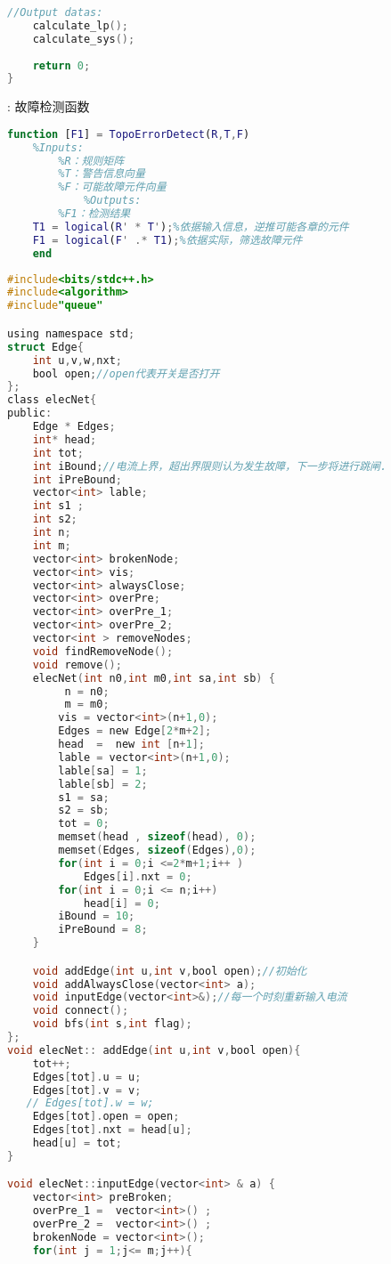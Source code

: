 \documentclass[withoutpreface,bwprint]{cumcmthesis} %
\begin{document}
\begin{appendices}
\begin{lstlisting}[language=C]
//Output datas:
    calculate_lp();
    calculate_sys();
    
    return 0;
}
\end{lstlisting}

: 故障检测函数
\begin{lstlisting}[language=matlab]
    function [F1] = TopoErrorDetect(R,T,F)
    %Inputs:
        %R：规则矩阵
        %T：警告信息向量
        %F：可能故障元件向量
            %Outputs:
        %F1：检测结果
    T1 = logical(R' * T');%依据输入信息，逆推可能各章的元件
    F1 = logical(F' .* T1);%依据实际，筛选故障元件
    end
\end{lstlisting}  

\begin{lstlisting}[language=C]
    #include<bits/stdc++.h>
#include<algorithm>
#include"queue"

using namespace std;
struct Edge{
    int u,v,w,nxt;
    bool open;//open代表开关是否打开
};
class elecNet{
public:
    Edge * Edges;
    int* head;
    int tot;
    int iBound;//电流上界，超出界限则认为发生故障，下一步将进行跳闸.
    int iPreBound;
    vector<int> lable;
    int s1 ;
    int s2;
    int n;
    int m;
    vector<int> brokenNode;
    vector<int> vis;
    vector<int> alwaysClose;
    vector<int> overPre;
    vector<int> overPre_1;
    vector<int> overPre_2;
    vector<int > removeNodes;
    void findRemoveNode();
    void remove();
    elecNet(int n0,int m0,int sa,int sb) {
         n = n0;
         m = m0;
        vis = vector<int>(n+1,0);
        Edges = new Edge[2*m+2];
        head  =  new int [n+1];
        lable = vector<int>(n+1,0);
        lable[sa] = 1;
        lable[sb] = 2;
        s1 = sa;
        s2 = sb;
        tot = 0;
        memset(head , sizeof(head), 0);
        memset(Edges, sizeof(Edges),0);
        for(int i = 0;i <=2*m+1;i++ )
            Edges[i].nxt = 0;
        for(int i = 0;i <= n;i++)
            head[i] = 0;
        iBound = 10;
        iPreBound = 8;
    }

    void addEdge(int u,int v,bool open);//初始化
    void addAlwaysClose(vector<int> a);
    void inputEdge(vector<int>&);//每一个时刻重新输入电流
    void connect();
    void bfs(int s,int flag);
};
void elecNet:: addEdge(int u,int v,bool open){
    tot++;
    Edges[tot].u = u;
    Edges[tot].v = v;
   // Edges[tot].w = w;
    Edges[tot].open = open;
    Edges[tot].nxt = head[u];
    head[u] = tot;
}

void elecNet::inputEdge(vector<int> & a) {
    vector<int> preBroken;
    overPre_1 =  vector<int>() ;
    overPre_2 =  vector<int>() ;
    brokenNode = vector<int>();
    for(int j = 1;j<= m;j++){


\end{lstlisting}
\end{appendices}
\end{document}
